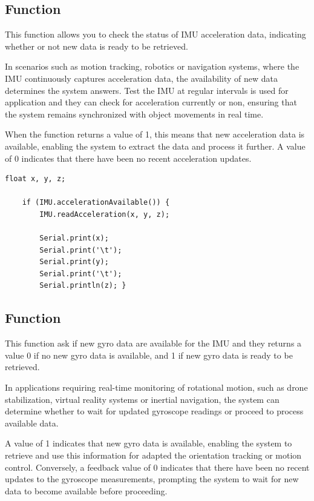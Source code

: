 \subsection{Function }

This function allows you to check the status of IMU acceleration data, indicating whether or not new data is ready to be retrieved.

In scenarios such as motion tracking, robotics or navigation systems, where the IMU continuously captures acceleration data, the availability of new data determines the system answers. Test the IMU at regular intervals is used for application and they can check for acceleration currently or non, ensuring that the system remains synchronized with object movements in real time. \cite{adafruit_lsm9ds1:2024}

When the function returns a value of 1, this means that new acceleration data is available, enabling the system to extract the data and process it further. A value of 0 indicates that there have been no recent acceleration updates.

\begin{lstlisting}[style=Arduino]
	float x, y, z;
	
	if (IMU.accelerationAvailable()) {
		IMU.readAcceleration(x, y, z);
		
		Serial.print(x);
		Serial.print('\t');
		Serial.print(y);
		Serial.print('\t');
		Serial.println(z); }

\end{lstlisting}


\subsection{Function }

This function ask if new gyro data are available for the IMU and they returns a value 0 if no new gyro data is available, and 1 if new gyro data is ready to be retrieved.

In applications requiring real-time monitoring of rotational motion, such as drone stabilization, virtual reality systems or inertial navigation, the system can determine whether to wait for updated gyroscope readings or proceed to process available data. \cite{Arduino_IMU_Gyroscope:2024}

A value of 1 indicates that new gyro data is available, enabling the system to retrieve and use this information for adapted the orientation tracking or motion control. Conversely, a feedback value of 0 indicates that there have been no recent updates to the gyroscope measurements, prompting the system to wait for new data to become available before proceeding.

